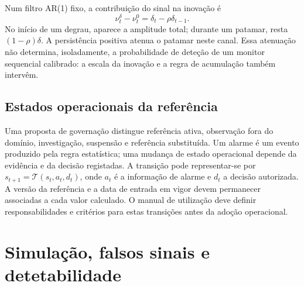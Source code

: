Num filtro AR(1) fixo, a contribuição do sinal na inovação é
\begin{equation}
\nu_t^\delta-\nu_t^0=\delta_t-\rho\delta_{t-1}.
\label{eq:mat-atenuacao-ar}
\end{equation}
No início de um degrau, aparece a amplitude total; durante um patamar, resta $(1-\rho)\delta$. A persistência positiva atenua o patamar neste canal. Essa atenuação não determina, isoladamente, a probabilidade de deteção de um monitor sequencial calibrado: a escala da inovação e a regra de acumulação também intervêm.

\subsection{Estados operacionais da referência}
\label{sec:mat-estados-operacionais}
Uma proposta de governação distingue referência ativa, observação fora do domínio, investigação, suspensão e referência substituída. Um alarme é um evento produzido pela regra estatística; uma mudança de estado operacional depende da evidência e da decisão registadas. A transição pode representar-se por $s_{t+1}=\mathcal T(s_t,a_t,d_t)$, onde $a_t$ é a informação de alarme e $d_t$ a decisão autorizada. A versão da referência e a data de entrada em vigor devem permanecer associadas a cada valor calculado. O manual de utilização deve definir responsabilidades e critérios para estas transições antes da adoção operacional.


\section{Simulação, falsos sinais e detetabilidade}
\label{sec:mat-simulacao}

